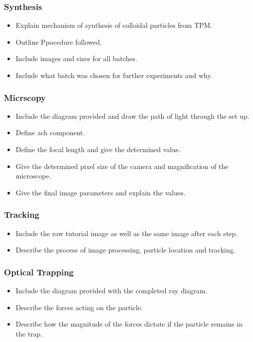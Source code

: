 \documentclass[12pt,a4paper,twoside]{article}
\begin{document}
\subsubsection{Synthesis}
 \begin{itemize}
	\item Explain mechanism of synthesis of colloidal particles from TPM.
	\item Outline Ppocedure followed.
	\item Include images and sizes for all batches.
	\item Include what batch was chosen for further experiments and why.	
\end{itemize}

\subsubsection{Micrscopy}
 \begin{itemize}
	\item Include the diagram provided and draw the path of light through the set up.
	\item Define ach component.
	\item Define the focal length and give the determined value.
	\item Give the determined pixel size of the camera and magnification of the microscope.
	\item Give the final image parameters and explain the values.
\end{itemize}

\subsubsection{Tracking}
 \begin{itemize}
	\item Include the raw tutorial image as well as the same image after each step.
	\item Describe the process of image processing, particle location and tracking.
\end{itemize}

\subsubsection{Optical Trapping}
 \begin{itemize}
	\item Include the diagram provided with the completed ray diagram.
	\item Describe the forces acting on the particle.
	\item Describe how the magnitude of the forces dictate if the particle remains in the trap.
\end{itemize}
\end{document}
